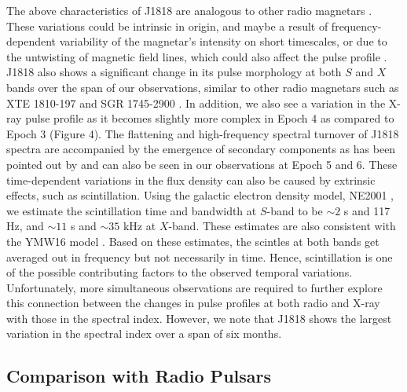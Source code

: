 \documentclass[twocolumn]{emulateapj}
\begin{document}
The above characteristics of J1818 are analogous to other radio magnetars \citep{lazaridis2008, torne2015}. These variations could be intrinsic in origin, and maybe a result of frequency-dependent variability of the magnetar's intensity on short timescales, or due to the untwisting of magnetic field lines, which could also affect the pulse profile \citep{scholz17}. J1818 also shows a significant change in its pulse morphology at both $S$ and $X$ bands over the span of our observations, similar to other radio magnetars such as XTE 1810-197 and SGR 1745-2900 \citep{camilo2007, pearlman2018}. In addition, we also see a variation in the X-ray pulse profile as it becomes slightly more complex in Epoch 4 as compared to Epoch 3 (Figure 4). The flattening and high-frequency spectral turnover of J1818 spectra are accompanied by the emergence of secondary components as has been pointed out by \cite{marcus2020b} and can also be seen in our observations at Epoch 5 and 6. These time-dependent variations in the flux density can also be caused by extrinsic effects, such as scintillation. Using the galactic electron density model, NE2001 \citep{cordes2002}, we estimate the scintillation time and bandwidth at $S$-band to be $\sim 2$ s and 117 Hz, and $\sim 11$ s and $\sim 35$ kHz at $X$-band. These estimates are also consistent with the YMW16 model \citep{Yao_2017}. Based on these estimates, the scintles at both bands get averaged out in frequency but not necessarily in time. Hence, scintillation is one of the possible contributing factors to the observed temporal variations. Unfortunately, more simultaneous observations are required to further explore this connection between the changes in pulse profiles at both radio and X-ray with those in the spectral index. However, we note that J1818 shows the largest variation in the spectral index over a span of six months. 




\subsection{Comparison with Radio Pulsars}
\end{document}
